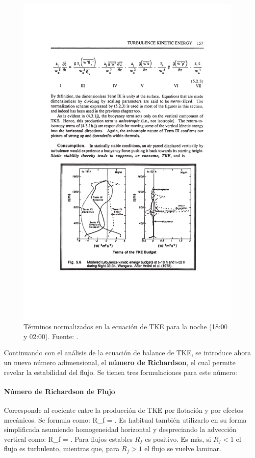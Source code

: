 \begin{figure}[h!]
	\centering
		\includegraphics[width=0.8\linewidth,trim={3.2cm 4.8cm 2.8cm 12.1cm},clip]{Imagenes/03/tke2}
	\caption{Términos normalizados en la ecuación de TKE para la noche (18:00 y 02:00). Fuente: \cite{stull1988introduction}.}
	\label{fig:03_tke2}
\end{figure}
 
Continuando con el análisis de la ecuación de balance de TKE, se introduce ahora un nuevo número adimensional, el \textbf{número de Richardson}, el cual permite revelar la estabilidad del flujo. Se tienen tres formulaciones para este número:

\paragraph{Número de Richardson de Flujo} Corresponde al cociente entre la producción de TKE por flotación y por efectos mecánicos. Se formula como:
\be R_f = . \ee
Es habitual también utilizarlo en su forma simplificada asumiendo homogeneidad horizontal y despreciando la advección vertical como:
\be R_f = . \ee
Para flujos estables $R_f$ es positivo. Es más, si $R_f < 1$ el flujo es turbulento, mientras que, para $R_f>1$ el flujo se vuelve laminar.
